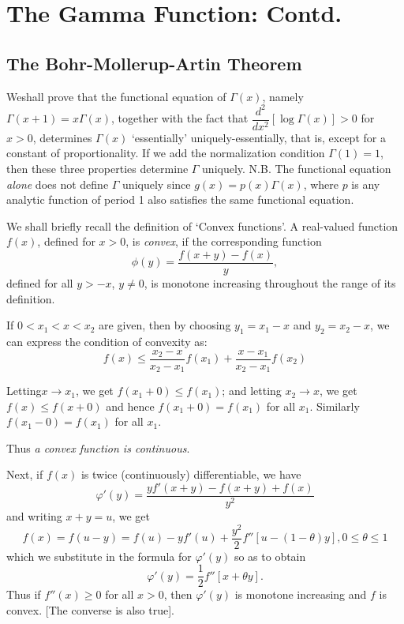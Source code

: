 \chapter{The Gamma Function: Contd.}\label{chap7}

\setcounter{section}{3}
\section[The Bohr-Mollerup-Artin Theorem]{The Bohr-Mollerup-Artin Theorem\hfil\break 
\protect \cite[Bd.I, p.276]{key7}}\label{chap7:sec4} 

We\pageoriginale shall prove that the functional equation of
$\Gamma(x)$, namely $\Gamma(x+1) =x \Gamma(x)$, together with the fact
that $\dfrac{d^2}{dx^2} [\log \Gamma (x)] > 0$ for $x>0$, determines
$\Gamma(x)$ `essentially' uniquely-essentially, that is, except for a
constant of proportionality. If we add the normalization condition
$\Gamma(1) = 1$, then these three properties determine $\Gamma$
uniquely. N.B. The functional equation \textit{alone} does not define
$\Gamma$ uniquely since $g(x) = p(x) \Gamma(x)$, where $p$ is any
analytic function of period 1 also satisfies the same functional
equation.

We shall briefly recall the definition of `Convex functions'. A
real-valued function $f(x)$, defined for $x>0$, is \textit{convex}, if
the corresponding function
$$
\phi (y) = \frac{f(x+y)-f(x)}{y},
$$
defined for all $y> -x$, $y \neq 0$, is monotone increasing throughout
the range of its definition.

If $0 < x_1 < x < x_2$ are given, then by choosing $y_1 = x_1 - x$ and
$y_2 = x_2 -x$, we can express the condition of convexity as:
$$
f(x) \leq \frac{x_2 -x}{x_2 -x_1} f(x_1) + \frac{x-x_1}{x_2 -x_1}
f(x_2) 
$$
 
Letting\pageoriginale $x\to x_1$, we get $f(x_1 + 0) \leq f(x_1)$; and
letting $x_2 \to x$, we get $f(x) \leq f(x+0)$ and hence $f(x_1 +0) =
f(x_1)$ for all $x_1$. Similarly $f(x_1 -0) = f(x_1)$ for all $x_1$.


Thus \textit{a convex function is continuous}. 

Next, if $f(x)$ is twice (continuously) differentiable, we have
$$
\varphi'(y) = \frac{yf'(x+y)-f(x+y) + f(x)}{y^2}
$$
and writing $x+y = u$, we get
$$
f(x) = f(u-y) = f(u) - y f' (u) + \frac{y^2}{2} f''[u-(1-\theta)y], 0
\leq \theta \leq 1
$$
which we substitute in the formula for $\varphi'(y)$ so as to obtain
$$
\varphi'(y) = \frac{1}{2} f''[x + \theta y].
$$
Thus if $f'' (x )\geq 0$ for all $x>0$, then $\varphi'(y)$ is monotone
increasing and $f$ is convex. [The converse is also true].

